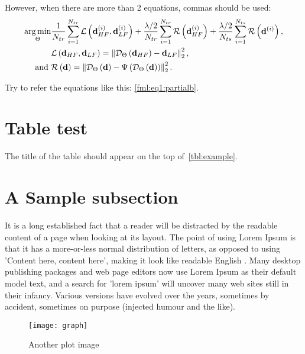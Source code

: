 However, when there are more than 2 equations, commas should be used:
\begin{equation} \label{fml:ptl:robust}
  \begin{aligned}
    \operatorname*{arg\,min}\limits_{\Theta} & \frac{1}{N_{tr}} \sum_{i=1}^{N_{tr}} \mathcal{L}\left(\mathbf{d}_{HF}^{(i)}, \mathbf{d}_{LF}^{(i)}\right) + \frac{\lambda/2}{N_{tr}} \sum_{i=1}^{N_{tr}} \mathcal{R}\left(\mathbf{d}_{HF}^{(i)}\right) + \frac{\lambda/2}{N_{ts}} \sum_{i=1}^{N_{ts}} \mathcal{R}\left(\mathbf{d}^{(i)}\right), \\
    &\mathcal{L} \left( \mathbf{d}_{HF}, \mathbf{d}_{LF} \right) = \left\lVert \mathcal{D}_{\Theta}\left( \mathbf{d}_{HF} \right) - \mathbf{d}_{LF} \right\rVert^2_2, \\
    \operatorname*{and}~&\mathcal{R} \left( \mathbf{d} \right) = \left\lVert \mathcal{D}_{\Theta}\left( \mathbf{d} \right) - \Psi\left(\mathcal{D}_{\Theta}\left( \mathbf{d} \right)\right) \right\rVert^2_2.
  \end{aligned}
\end{equation}

Try to refer the equations like this: \eqref{fml:eq1:partialb}.

\section{Table test}

The title of the table should appear on the top of~\autoref{tbl:example}.

\section{A Sample subsection}
It is a long established fact that a reader will be distracted by the readable content of a page when looking at its layout. The point of using Lorem Ipsum is that it has a more-or-less normal distribution of letters, as opposed to using 'Content here, content here', making it look like readable English \cite{gass}. Many desktop publishing packages and web page editors now use Lorem Ipsum as their default model text, and a search for 'lorem ipsum' will uncover many web sites still in their infancy. Various versions have evolved over the years, sometimes by accident, sometimes on purpose (injected humour and the like).

\begin{figure}[ht]
  \label{hourglass}
  \begin{center}
    \texttt{[image: graph]}
    \caption{Another plot image}
  \end{center}
\end{figure}

